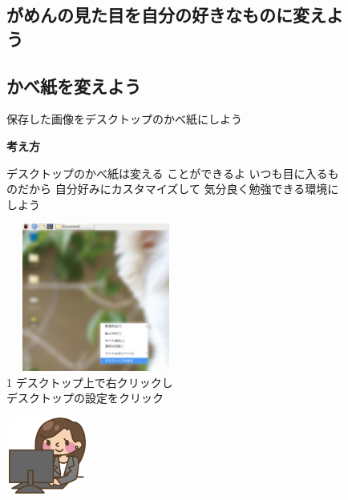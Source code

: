\documentclass[a4paper,12pt]{jarticle}
\begin{document}
\begin{figure}
  \subsection{がめんの見た目を自分の好きなものに変えよう}
  \subsection{\theExercise かべ紙を変えよう}
  保存した画像をデスクトップのかべ紙にしよう

  \textbf{考え方}


  \bigskip



  \centering
  \begin{minipage}{\textwidth}
    \begin{minipage}{7.737cm}
      デスクトップのかべ紙は変える
      ことができるよ
      いつも目に入るものだから
      自分好みにカスタマイズして
      気分良く勉強できる環境にしよう
      \begin{minipage}{7.739cm}
        \includegraphics[width=5.892cm,height=4.864cm]{textbook-img107.png}\\
        1 デスクトップ上で右クリックし\\
        デスクトップの設定をクリック
      \end{minipage}
    \end{minipage}
    \begin{minipage}{2.582cm}
    \end{minipage}
    \begin{minipage}{7.737cm}
      \includegraphics[width=2.712cm,height=2.509cm]{textbook-img082.png}

\end{minipage}
\end{minipage}
\end{figure}
\end{document}
